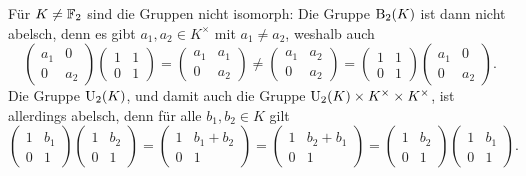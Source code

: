 \begin{solution}
\begin{enumerate}
      Für $K \neq \mathbb{F}_2$ sind die Gruppen nicht isomorph:
      Die Gruppe $\operatorname{B}_2(K)$ ist dann nicht abelsch, denn es gibt $a_1, a_2 \in K^\times$ mit $a_1 \neq a_2$, weshalb auch
      \[
        \begin{pmatrix}
          a_1 & 0   \\
          0   & a_2
        \end{pmatrix}
        \begin{pmatrix}
          1 & 1 \\
          0 & 1
        \end{pmatrix}
        =
        \begin{pmatrix}
          a_1 & a_1 \\
          0   & a_2
        \end{pmatrix}
        \neq
        \begin{pmatrix}
          a_1 & a_2 \\
          0   & a_2
        \end{pmatrix}
        =
        \begin{pmatrix}
          1 & 1 \\
          0 & 1
        \end{pmatrix}
        \begin{pmatrix}
          a_1 & 0   \\
          0   & a_2
        \end{pmatrix}.
      \]
      Die Gruppe $\operatorname{U}_2(K)$, und damit auch die Gruppe $\operatorname{U}_2(K) \times K^\times \times K^\times$, ist allerdings abelsch, denn für alle $b_1, b_2 \in K$ gilt
      \[
        \begin{pmatrix}
          1 & b_1 \\
          0 & 1
        \end{pmatrix}
        \begin{pmatrix}
          1 & b_2 \\
          0 & 1
        \end{pmatrix}
        =
        \begin{pmatrix}
          1 & b_1 + b_2 \\
          0 & 1
        \end{pmatrix}
        =
        \begin{pmatrix}
          1 & b_2 + b_1 \\
          0 & 1
        \end{pmatrix}
        =
        \begin{pmatrix}
          1 & b_2 \\
          0 & 1
        \end{pmatrix}
        \begin{pmatrix}
          1 & b_1 \\
          0 & 1
        \end{pmatrix}.
      \]
  \end{enumerate}
\end{solution}


